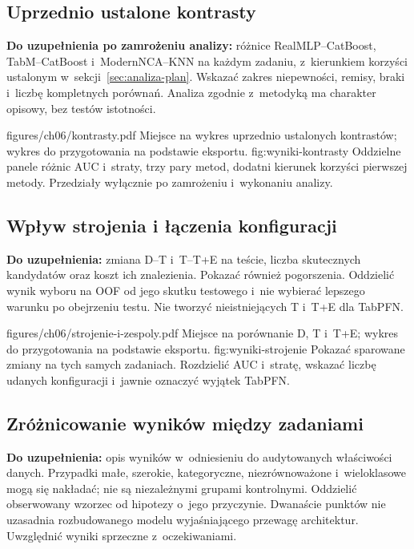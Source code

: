 \subsection{Uprzednio ustalone kontrasty}
\label{sec:wyniki-kontrasty}

\textbf{Do uzupełnienia po zamrożeniu analizy:} różnice RealMLP--CatBoost, TabM--CatBoost i~ModernNCA--KNN na każdym zadaniu, z~kierunkiem korzyści ustalonym w~sekcji~\ref{sec:analiza-plan}. Wskazać zakres niepewności, remisy, braki i~liczbę kompletnych porównań. Analiza zgodnie z~metodyką ma charakter opisowy, bez testów istotności.

\plannedfigure
{figures/ch06/kontrasty.pdf}
{Miejsce na wykres uprzednio ustalonych kontrastów; wykres do przygotowania na podstawie eksportu.}
{fig:wyniki-kontrasty}
{Oddzielne panele różnic AUC i~straty, trzy pary metod, dodatni kierunek korzyści pierwszej metody. Przedziały wyłącznie po zamrożeniu i~wykonaniu analizy.}

\subsection{Wpływ strojenia i łączenia konfiguracji}
\label{sec:wyniki-strojenie}

\textbf{Do uzupełnienia:} zmiana D--T i~T--T+E na teście, liczba skutecznych kandydatów oraz koszt ich znalezienia. Pokazać również pogorszenia. Oddzielić wynik wyboru na OOF od jego skutku testowego i~nie wybierać lepszego warunku po obejrzeniu testu. Nie tworzyć nieistniejących T i~T+E dla TabPFN.

\plannedfigure
{figures/ch06/strojenie-i-zespoly.pdf}
{Miejsce na porównanie D, T i~T+E; wykres do przygotowania na podstawie eksportu.}
{fig:wyniki-strojenie}
{Pokazać sparowane zmiany na tych samych zadaniach. Rozdzielić AUC i~stratę, wskazać liczbę udanych konfiguracji i~jawnie oznaczyć wyjątek TabPFN.}

\subsection{Zróżnicowanie wyników między zadaniami}
\label{sec:wyniki-heterogenicznosc}

\textbf{Do uzupełnienia:} opis wyników w~odniesieniu do audytowanych właściwości danych. Przypadki małe, szerokie, kategoryczne, niezrównoważone i~wieloklasowe mogą się nakładać; nie są niezależnymi grupami kontrolnymi. Oddzielić obserwowany wzorzec od hipotezy o~jego przyczynie. Dwanaście punktów nie uzasadnia rozbudowanego modelu wyjaśniającego przewagę architektur. Uwzględnić wyniki sprzeczne z~oczekiwaniami.

